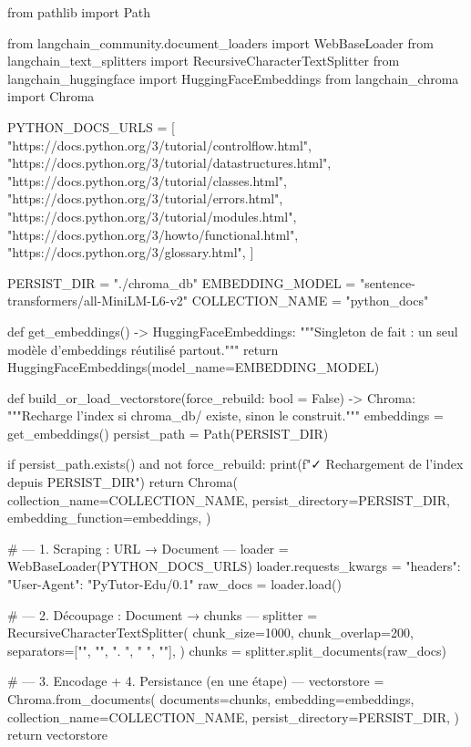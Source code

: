 \documentclass[11pt,a4paper]{article}
\begin{document}
\begin{pythoncode}
from pathlib import Path

from langchain_community.document_loaders import WebBaseLoader
from langchain_text_splitters import RecursiveCharacterTextSplitter
from langchain_huggingface import HuggingFaceEmbeddings
from langchain_chroma import Chroma


PYTHON_DOCS_URLS = [
    "https://docs.python.org/3/tutorial/controlflow.html",
    "https://docs.python.org/3/tutorial/datastructures.html",
    "https://docs.python.org/3/tutorial/classes.html",
    "https://docs.python.org/3/tutorial/errors.html",
    "https://docs.python.org/3/tutorial/modules.html",
    "https://docs.python.org/3/howto/functional.html",
    "https://docs.python.org/3/glossary.html",
]

PERSIST_DIR     = "./chroma_db"
EMBEDDING_MODEL = "sentence-transformers/all-MiniLM-L6-v2"
COLLECTION_NAME = "python_docs"


def get_embeddings() -> HuggingFaceEmbeddings:
    """Singleton de fait : un seul modèle d'embeddings réutilisé partout."""
    return HuggingFaceEmbeddings(model_name=EMBEDDING_MODEL)


def build_or_load_vectorstore(force_rebuild: bool = False) -> Chroma:
    """Recharge l'index si chroma_db/ existe, sinon le construit."""
    embeddings = get_embeddings()
    persist_path = Path(PERSIST_DIR)

    if persist_path.exists() and not force_rebuild:
        print(f"✓ Rechargement de l'index depuis {PERSIST_DIR}")
        return Chroma(
            collection_name=COLLECTION_NAME,
            persist_directory=PERSIST_DIR,
            embedding_function=embeddings,
        )

    # --- 1. Scraping : URL → Document ---
    loader = WebBaseLoader(PYTHON_DOCS_URLS)
    loader.requests_kwargs = {"headers": {"User-Agent": "PyTutor-Edu/0.1"}}
    raw_docs = loader.load()

    # --- 2. Découpage : Document → chunks ---
    splitter = RecursiveCharacterTextSplitter(
        chunk_size=1000,
        chunk_overlap=200,
        separators=["\n\n", "\n", ". ", " ", ""],
    )
    chunks = splitter.split_documents(raw_docs)

    # --- 3. Encodage + 4. Persistance (en une étape) ---
    vectorstore = Chroma.from_documents(
        documents=chunks,
        embedding=embeddings,
        collection_name=COLLECTION_NAME,
        persist_directory=PERSIST_DIR,
    )
    return vectorstore
\end{pythoncode}
\end{document}

